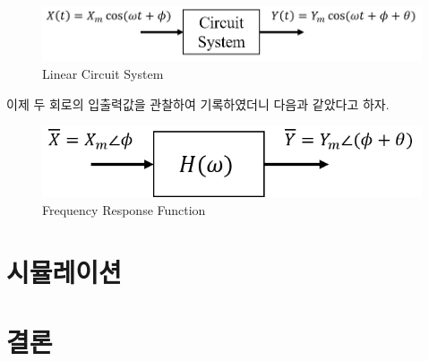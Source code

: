 \documentclass{article}
\begin{document}
\begin{figure}[h]
    \centering
    \includegraphics[scale=0.6]{./Linear Circuit System.png}
    \caption{Linear Circuit System}
\end{figure}

이제 두 회로의 입출력값을 관찰하여 기록하였더니 다음과 같았다고 하자.

\begin{figure}[h]
    \centering
    \includegraphics[scale=0.6]{./Frequency Response Function.png}
    \caption{Frequency Response Function}
\end{figure}

\section{시뮬레이션}

\section{결론}
\end{document}
